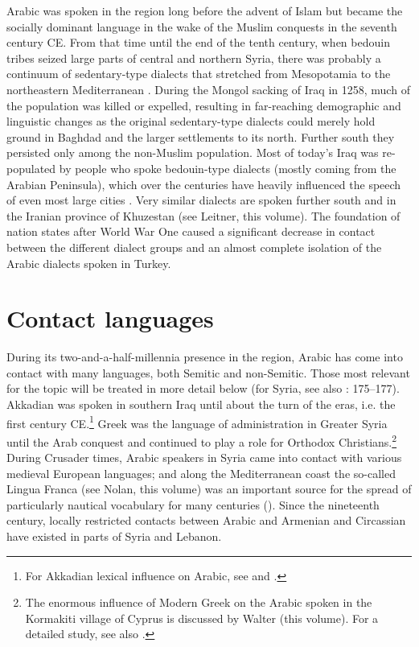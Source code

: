 \documentclass[output=paper]{langsci/langscibook}
\begin{document}
Arabic was spoken in the region long before the advent of Islam \citep[95]{Donner1981} but became the socially dominant language in the wake of the Muslim conquests in the seventh century CE. From that time until the end of the tenth century, when bedouin tribes seized large parts of central and northern Syria, there was probably a continuum of sedentary-type dialects that stretched from Mesopotamia to the northeastern Mediterranean \citep[291]{Procházka2018Fertile}. During the Mongol sacking of Iraq in 1258, much of the population was killed or expelled, resulting in far-reaching demographic and linguistic changes as the original sedentary-type dialects could merely hold ground in Baghdad and the larger settlements to its north. Further south they persisted only among the non-Muslim population. Most of today’s Iraq was re-populated by people who spoke bedouin-type dialects (mostly coming from the Arabian Peninsula), which over the centuries have heavily influenced the speech of even most large cities \citep{Holes2007}. Very similar dialects are spoken further south and in the Iranian province of Khuzestan (see Leitner, this volume). The foundation of nation states after World War One caused a significant decrease in contact between the different dialect groups and an almost complete isolation of the Arabic dialects spoken in Turkey.

\section{Contact languages} 

During its two-and-a-half-millennia presence in the region, Arabic has come into contact with many languages, both Semitic and non-Semitic. Those most relevant for the topic will be treated in more detail below (for Syria, see also \citealt{Barbot1961}: 175--177). Akkadian was spoken in southern Iraq until about the turn of the eras, i.e. the first century CE.\footnote{For Akkadian lexical influence on Arabic, see \citet{Holes2002} and \citet{Krebernik2008}.} Greek was the language of administration in Greater Syria until the Arab conquest \citep[185--187]{Magidow2013} and continued to play a role for Orthodox Christians.\footnote{The enormous influence of Modern Greek on the Arabic spoken in the Kormakiti village of Cyprus is discussed by Walter (this volume). For a detailed study, see also \citealt{Borg1985}.} During Crusader times, Arabic speakers in Syria came into contact with various medieval European languages; and along the Mediterranean coast the so-called Lingua Franca (see Nolan, this volume) was an important source for the spread of particularly nautical vocabulary for many centuries (\citealt{KahaneKahaneTietze1958}). Since the nineteenth century, locally restricted contacts between Arabic and Armenian and Circassian have existed in parts of Syria and Lebanon. 
\end{document}
